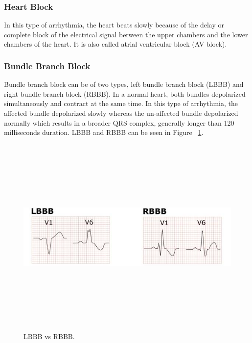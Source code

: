 \subsubsection{Heart Block}
In this type of arrhythmia, the heart beats slowly because of the delay or complete block of the electrical signal between the upper chambers and the lower chambers of the heart. It is also called atrial ventricular block (AV block).

\subsubsection{Bundle Branch Block}
Bundle branch block can be of two types, left bundle branch block (LBBB) and right bundle branch block (RBBB). In a normal heart, both bundles depolarized simultaneously and contract at the same time. In this type of arrhythmia, the affected bundle depolarized slowly whereas the un-affected bundle depolarized normally which results in a broader QRS complex, generally longer than 120 milliseconds duration. LBBB and RBBB can be seen in Figure ~\ref{fig:LRBBB}.


\begin{figure}[htpb]
	\centering
	\includegraphics[width=12cm,height=10cm,keepaspectratio=true]{images/LRBBB}
	\caption{
		LBBB vs RBBB\cite{bilagi}.
	}
	\label{fig:LRBBB}
\end{figure}